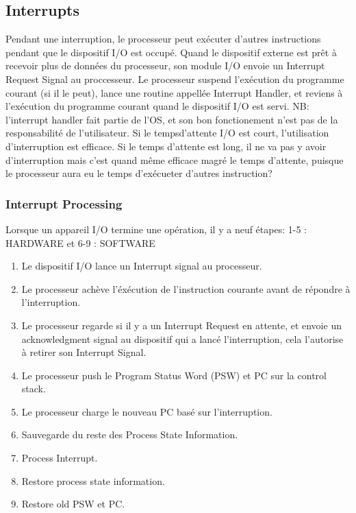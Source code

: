 \subsection{Interrupts}
Pendant une interruption, le processeur peut exécuter d’autres instructions pendant que le dispositif I/O est occupé. Quand le dispositif externe est prêt à recevoir plus de données du processeur, son module I/O envoie un Interrupt Request Signal au proccesseur. Le processeur suspend l’exécution du programme courant (si il le peut), lance une routine appellée Interrupt Handler, et reviens à l’exécution du programme courant quand le dispositif I/O est servi.
NB: l’interrupt handler fait partie de l’OS, et son bon fonctionement n’est pas de la responsabilité de l’utilisateur. Si le tempsd’attente I/O est court, l’utilisation d’interruption est efficace. Si le temps d’attente est long, il ne va pas y avoir d’interruption mais c’est quand même efficace magré le temps d’attente, puisque le processeur aura eu le temps d’exécueter d’autres instruction?


\subsubsection{Interrupt Processing}
Lorsque un appareil I/O termine une opération, il y a neuf étapes: 1-5 : HARDWARE et 6-9 : SOFTWARE \
\begin{enumerate}
\item Le dispositif I/O lance un Interrupt signal au processeur.
\item Le processeur achève l’éxécution de l’instruction courante avant de répondre à l’interruption.
\item Le processeur regarde si il y a un Interrupt Request en attente, et envoie un acknowledgment signal au dispositif qui a lancé l’interruption, cela l’autorise à retirer son Interrupt Signal.
\item Le processeur push le Program Status Word (PSW) et PC sur la control stack.
\item Le processeur charge le nouveau PC basé sur l’interruption.
\item Sauvegarde du reste des Process State Information.
\item Process Interrupt.
\item Restore process state information.
\item Restore old PSW et PC.

\end{enumerate}



